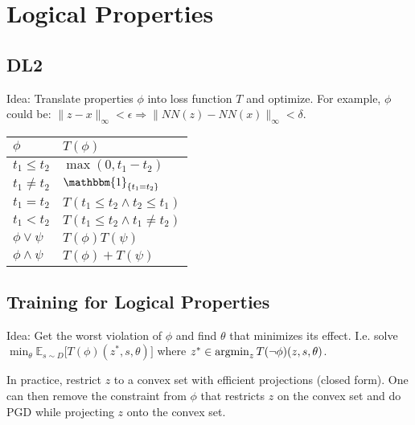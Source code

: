\section{Logical Properties}
\subsection*{DL2}
Idea: Translate properties $\phi$ into loss function $T$ and optimize.
For example, $\phi$ could be: $\|z-x\|_{\infty}<\epsilon \Rightarrow \|NN(z)-NN(x)\|_{\infty}<\delta$.


\vspace*{1mm}
\renewcommand{\arraystretch}{1.1}
\begin{tabular}{ll}
    \hline
    $\phi $           & $T(\phi)$                            \\
    \hline
    $t_1 \leq t_2$    & $\max(0, t_1 - t_2)$                 \\
    $t_1 \neq t_2$    & $\mathbbm{1}_{\{t_1 = t_2\}}$        \\
    $t_1 = t_2$       & $T(t_1 \leq t_2 \land t_2 \leq t_1)$ \\
    $t_1 < t_2$       & $T(t_1 \leq t_2 \land t_1 \neq t_2)$ \\
    $\phi \lor \psi$  & $T(\phi) T(\psi)$                    \\
    $\phi \land \psi$ & $T(\phi) + T(\psi)$                  \\
    \hline
\end{tabular}
\vspace*{1mm}

\subsection*{Training for Logical Properties}
Idea: Get the worst violation of $\phi$ and find $\theta$ that minimizes its effect. I.e. solve {$\min_\theta\mathbb{E}_{s \sim D} \big[ T(\phi)(z^*, s, \theta) \big]$} where {$z^* \in \operatorname{\operatorname{argmin}}_z T(\lnot \phi)(z, s, \theta)$}.

In practice, restrict $z$ to a convex set with efficient projections (closed form). One can then remove the constraint from $\phi$ that restricts $z$ on the convex set and do PGD while projecting $z$ onto the convex set.